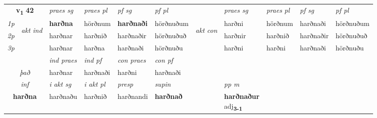 \noindent
\begin{tabular}{lllllllllll} \toprule
\multicolumn{2}{c}{\textbf{v{\textsubscript{1}}} \Large{\textbf{42}}}  &  \textit{praes sg}  & \textit{praes pl}  &\textit{ pf sg} & \textit{pf pl} &  &  \textit{praes sg}  & \textit{praes pl}  & \textit{pf sg} & \textit{pf pl } \\*
	\cmidrule{3-6} \cmidrule{8-11}
 {\textit{1p}} & \multirow{3}{*}{\begin{turn}{90}\textit{akt ind}\end{turn}} & \textbf{harðna} & hörðnum & \textbf{harðnaði} & hörðnuðum & \multirow{3}{*}{\begin{turn}{90}\textit{akt con}\end{turn}} &harðni & hörðnum & harðnaði & hörðnuðum\\*
 {\textit{2p}} &  &  harðnar  & harðnið & harðnaðir & hörðnuðuð & & harðnir & harðnið & harðnaðir & hörðnuðuð \\*
{\textit{3p}} &  & harðnar & harðna & harðnaði & hörðnuðu & & harðni & harðni& harðnaði & hörðnuðu \\*
\cmidrule{3-6} \cmidrule{8-11}

   & &  \textit{ind praes} & \textit{ind pf} & \textit{con praes} & \textit{con pf} \\*
\multicolumn{2}{c}{ \textit{það} } & harðnar & harðnaði & harðni & harðnaði \\*

\cmidrule{3-8}
   \multicolumn{2}{c}{\textit{inf}}  & \textit{i akt sg} & \textit{i akt pl}   & \textit{presp} & \textit{supin}  && \textit{pp m} \\*
  \multicolumn{2}{c}{\textbf{harðna}} & harðnaðu  & harðnið   & harðnandi &  \textbf{harðnað}  && \specialcell{\textbf{harðnaður} \\ adj\textbf{\textsubscript{3-1}}} \\*
\end{tabular}

